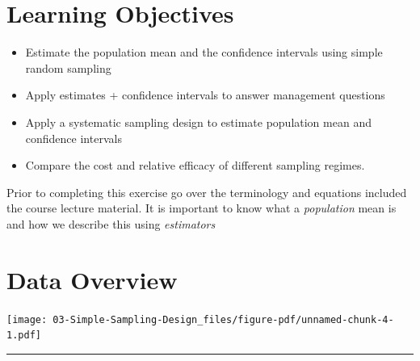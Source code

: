 \documentclass[
  letterpaper,
]{book}
\begin{document}
\hypertarget{learning-objectives-2}{%
\section*{Learning Objectives}\label{learning-objectives-2}}


\begin{itemize}
\item
  Estimate the population mean and the confidence intervals using simple
  random sampling
\item
  Apply estimates + confidence intervals to answer management questions
\item
  Apply a systematic sampling design to estimate population mean and
  confidence intervals
\item
  Compare the cost and relative efficacy of different sampling regimes.
\end{itemize}

\begin{tcolorbox}[enhanced jigsaw, colbacktitle=quarto-callout-note-color!10!white, leftrule=.75mm, left=2mm, opacitybacktitle=0.6, breakable, colframe=quarto-callout-note-color-frame, arc=.35mm, bottomtitle=1mm, rightrule=.15mm, title=\textcolor{quarto-callout-note-color}{\faInfo}\hspace{0.5em}{Note}, toptitle=1mm, titlerule=0mm, opacityback=0, coltitle=black, colback=white, bottomrule=.15mm, toprule=.15mm]

Prior to completing this exercise go over the terminology and equations
included the course lecture material. It is important to know what a
\emph{population} mean is and how we describe this using
\emph{estimators}

\end{tcolorbox}

\hypertarget{data-overview}{%
\section*{Data Overview}\label{data-overview}}


\texttt{[image: 03-Simple-Sampling-Design\_files/figure-pdf/unnamed-chunk-4-1.pdf]}

\begin{center}\rule{0.5\linewidth}{0.5pt}\end{center}
\end{document}
